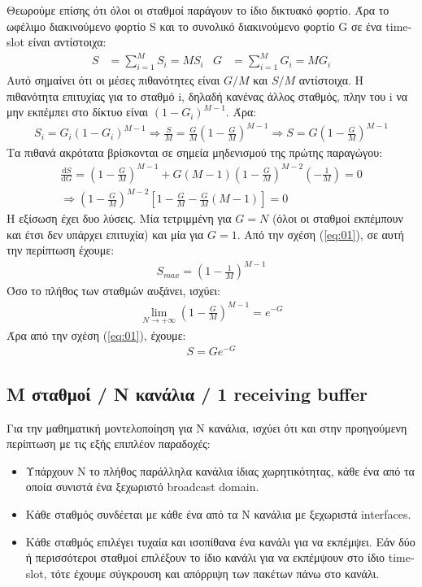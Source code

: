 \documentclass[12pt]{report}
\begin{document}
Θεωρούμε επίσης ότι όλοι οι σταθμοί παράγουν το ίδιο δικτυακό φορτίο. Άρα το ωφέλιμο διακινούμενο φορτίο \textlatin{S} και το συνολικό διακινούμενο φορτίο \textlatin{G} σε ένα \textlatin{timeslot} είναι αντίστοιχα:
\begin{align}
  S&=\sum_{i=1}^{M} S_i = MS_i & G&=\sum_{i=1}^{M} G_i = MG_i
\end{align}
Αυτό σημαίνει ότι οι μέσες πιθανότητες είναι \textlatin{\(G/M\)} και \textlatin{\(S/M\)} αντίστοιχα. Η πιθανότητα επιτυχίας για το σταθμό \textlatin{i}, δηλαδή κανένας άλλος σταθμός, πλην του \textlatin{i} να μην εκπέμπει στο δίκτυο είναι \textlatin{\((1-G_i)^{M-1}\)}. Άρα:
\begin{align}\label{eq:01}
   {S_i}={G_i}(1-G_i)^{M-1} \Rightarrow  \frac{S}{M}=\frac{G}{M} \left (1-\frac{G}{M} \right )^{M-1} \Rightarrow S=G \left (1-\frac{G}{M} \right )^{M-1}
\end{align}
Τα πιθανά ακρότατα βρίσκονται σε σημεία μηδενισμού της πρώτης παραγώγου:
\begin{align*}
  \frac{\mathrm{d} S}{\mathrm{d} G}= \left ( 1-\frac{G}{M} \right )^{M-1} + G(M-1)\left ( 1-\frac{G}{M}\right )^{M-2} \left ( -\frac{1}{M} \right )=0 \\
  \Rightarrow \left ( 1-\frac{G}{M} \right )^{M-2} \left [ 1-\frac{G}{M}-\frac{G}{M}(M-1) \right ]=0
\end{align*}
Η εξίσωση έχει δυο λύσεις. Μία τετριμμένη για \(G=N\) (όλοι οι σταθμοί εκπέμπουν και έτσι δεν υπάρχει επιτυχία) και μία για \(G=1\). Από την σχέση (\ref{eq:01}), σε αυτή την περίπτωση έχουμε:
\begin{align}\label{eq:02}
  S_{max}=\left (1-\frac{1}{M} \right )^{M-1}
\end{align}
Όσο το πλήθος των σταθμών αυξάνει, ισχύει:
\begin{align*}
  \lim_{N \rightarrow +\infty}{\left (1-\frac{G}{M} \right )^{M-1}}=e^{-G}
\end{align*}
Άρα από την σχέση (\ref{eq:01}), έχουμε:
\begin{align}\label{eq:03}
  S=Ge^{-G}
\end{align}

\subsection{\textlatin{M} σταθμοί / N κανάλια / 1 \textlatin{receiving buffer}}
Για την μαθηματική μοντελοποίηση για \textlatin{N} κανάλια, ισχύει ότι και στην προηγούμενη περίπτωση με τις εξής επιπλέον παραδοχές:
\begin{itemize}
	\item Υπάρχουν \textlatin{N} το πλήθος παράλληλα κανάλια ίδιας χωρητικότητας, κάθε ένα από τα οποία συνιστά ένα ξεχωριστό \textlatin{broadcast domain}.
	\item Κάθε σταθμός συνδέεται με κάθε ένα από τα \textlatin{N} κανάλια με ξεχωριστά \textlatin{interfaces}.
	\item Κάθε σταθμός επιλέγει τυχαία και ισοπίθανα ένα κανάλι για να εκπέμψει. Εάν δύο ή περισσότεροι σταθμοί επιλέξουν το ίδιο κανάλι για να εκπέμψουν στο ίδιο \textlatin{timeslot}, τότε έχουμε σύγκρουση και απόρριψη των πακέτων πάνω στο κανάλι.
\end{itemize}
\end{document}
